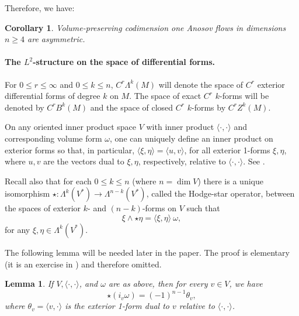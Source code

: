 \documentclass[11pt,letterpaper,reqno,abstract=true]{scrartcl}
\theoremstyle{plain}                              %
\newtheorem{lem}[thm]{Lemma}
\newtheorem{cor}[thm]{Corollary}
\theoremstyle{definition}                         %
\theoremstyle{remark}                             %
\begin{document}
Therefore, we have:

\begin{cor}
  Volume-preserving codimension one Anosov flows in dimensions $n \geq
  4$
  are asymmetric.
\end{cor}

\paragraph{The $L^2$-structure on the space of differential forms.}

For $0 \leq r \leq \infty$ and $0 \leq k \leq n$, $C^r \Lambda^k(M)$
will denote the space of $C^r$ exterior differential forms of degree
$k$ on $M$. The space of exact $C^r$ $k$-forms will be denoted by
$C^r B^k(M)$ and the space of closed $C^r$ $k$-forms by $C^r Z^k(M)$.


On any oriented inner product space $V$ with inner product
$\langle \cdot, \cdot \rangle$ and corresponding volume form $\omega$,
one can uniquely define an inner product on exterior forms so that, in
particular, $\langle \xi, \eta \rangle = \langle u, v \rangle$, for
all exterior 1-forms $\xi, \eta$, where $u, v$ are the vectors dual to
$\xi, \eta$, respectively, relative to $\langle \cdot, \cdot
\rangle$. See \cite{lee+smooth+13,warner+83}.

Recall also that for each $0 \leq k \leq n$ (where $n = \dim V$) there
is a unique isomorphism
$\star : \Lambda^k(V^\ast) \to \Lambda^{n-k}(V^\ast)$, called the
\textsf{Hodge-star operator}, between the spaces of exterior $k$- and
$(n-k)$-forms on $V$ such that
%
\begin{equation}   \label{eq:Hodge-star}
  \xi \wedge \star \eta = \langle \xi, \eta \rangle \: \omega,
\end{equation}
%
for any $\xi, \eta \in \Lambda^k(V^\ast)$.

The following lemma will be needed later in the paper. The proof is
elementary (it is an exercise in \cite{lee+smooth+13}) and therefore
omitted.

\begin{lem}       \label{lem:star} 
%
  If $V, \langle \cdot, \cdot \rangle$, and $\omega$ are as above,
  then for every $v \in V$, we have
%
  \begin{displaymath}
    \star (i_v \omega) = (-1)^{n-1} \theta_v,
  \end{displaymath}
%
  where $\theta_v = \langle v, \cdot \rangle$ is the exterior 1-form
  dual to $v$ relative to $\langle \cdot, \cdot \rangle$.
%
  \end{lem}
\end{document}
